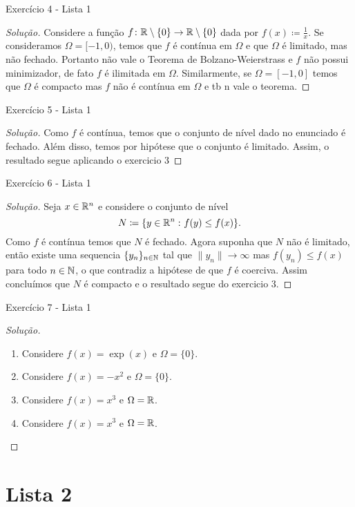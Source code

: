 \documentclass[12pt,twoside,a4paper]{article}
\begin{document}
\begin{problema}
Exercício 4 - Lista 1
\end{problema}
\begin{proof}[Solução]
Considere a função \(f\colon\mathbb{R}\setminus\{0\}\to\mathbb{R}\setminus\{0\}\) dada por \(f(x)\coloneqq\frac{1}{x}\). Se consideramos
\(\Omega=[-1,0)\), temos que \(f\) é contínua em \(\Omega\) e que \(\Omega\) é limitado, mas não fechado.
Portanto não vale o Teorema de Bolzano-Weierstrass e \(f\) não possui minimizador, de fato \(f\) é ilimitada em \(\Omega\).
Similarmente, se \(\Omega=[-1,0]\) temos que \(\Omega\) é compacto mas \(f\) não é contínua em \(\Omega\) e tb n vale o teorema.
\end{proof}

\begin{problema}
Exercício 5 - Lista 1   
\end{problema}
\begin{proof}[Solução]
Como \(f\) é contínua, temos que o conjunto de nível dado no enunciado é fechado. Além disso, temos
por hipótese que o conjunto é limitado. Assim, o resultado segue aplicando o exercicio 3
\end{proof}

\begin{problema}
Exercício 6 - Lista 1  
\end{problema}
\begin{proof}[Solução]
Seja \(x\in\mathbb{R}^n\) e considere o conjunto de nível \[N\coloneqq\{y\in\mathbb{R}^n\,\colon f(y)\leq f(x)\}.\]
Como \(f\) é contínua temos que \(N\) é fechado. Agora suponha que \(N\) não é limitado,
então existe uma sequencia \(\{y_n\}_{n\in\mathbb{N}}\) tal que \(\|y_n\|\rightarrow\infty\) mas \(f(y_n)\leq f(x)\) para
todo \(n\in\mathbb{N}\), o que contradiz a hipótese de que \(f\) é coerciva. Assim concluímos que \(N\) é compacto e o resultado 
segue do exercicio 3.
\end{proof}

\begin{problema}
Exercício 7 - Lista 1
\end{problema}
\begin{proof}[Solução]\hfill
  \begin{enumerate}
\item Considere \(f(x)=\exp(x)\) e \(\Omega=\{0\}\).
\item Considere \(f(x)=-x^2\) e \(\Omega=\{0\}\).
\item Considere \(f(x)=x^3\) e \(\Omega=\mathbb{R}\).
\item Considere \(f(x)=x^3\) e \(\Omega=\mathbb{R}\).
\end{enumerate}
\end{proof}

\section{Lista 2}
\end{document}
